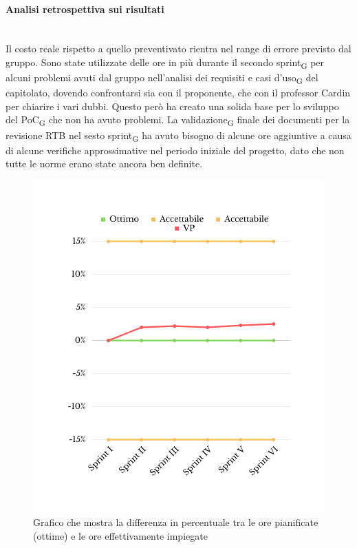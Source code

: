 \paragraph{Analisi retrospettiva sui risultati}\mbox{}\\
Il costo reale rispetto a quello preventivato rientra nel range di errore previsto dal gruppo. Sono state utilizzate delle ore in più durante il secondo sprint\textsubscript{G} per alcuni problemi avuti dal gruppo nell'analisi dei requisiti e casi d'uso\textsubscript{G} del capitolato, dovendo confrontarsi sia con il proponente, che con il professor Cardin per chiarire i vari dubbi. Questo però ha creato una solida base per lo sviluppo del PoC\textsubscript{G} che non ha avuto problemi. La validazione\textsubscript{G} finale dei documenti per la revisione RTB nel sesto sprint\textsubscript{G} ha avuto bisogno di alcune ore aggiuntive a causa di alcune verifiche approssimative nel periodo iniziale del progetto, dato che non tutte le norme erano state ancora ben definite.
\begin{figure}[H]
	\centering
	\includegraphics[scale=0.5]{img/SV.png}
	\caption{Grafico che mostra la differenza in percentuale tra le ore pianificate (ottime) e le ore effettivamente impiegate}
\end{figure}
